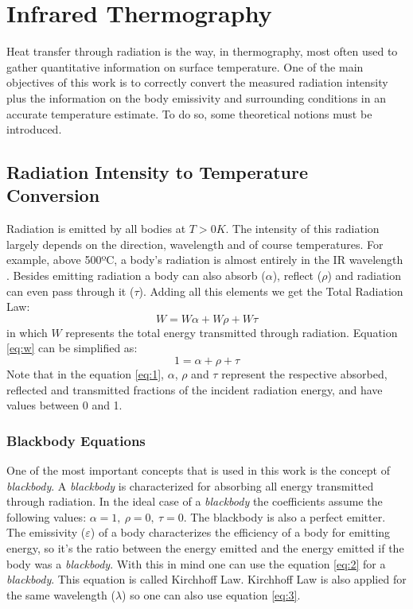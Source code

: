 \section{Infrared Thermography}
\label{sec:sectiona}

Heat transfer through radiation is the way, in thermography, most often used to gather quantitative information on surface temperature. One of the main objectives of this work is to correctly convert the measured radiation intensity plus the information on the body emissivity and surrounding conditions in an accurate temperature estimate. To do so, some theoretical notions must be introduced.

\subsection{Radiation Intensity to Temperature Conversion}
\label{subsec:rad2tem}

Radiation is emitted by all bodies at $T>0 K$. The intensity of this radiation largely depends on the direction, wavelength and of course temperatures. For example, above 500ºC, a body's radiation is almost entirely in the IR wavelength \cite{IRCAM}. Besides emitting radiation a body can also absorb ($\alpha$), reflect ($\rho$) and radiation can even pass through it ($\tau$). Adding all this elements we get the Total Radiation Law:
\begin{equation}\label{eq:w}
    W = W\alpha + W\rho + W\tau
\end{equation}
in which $W$ represents the total energy transmitted through radiation. Equation \ref{eq:w} can be simplified as:
\begin{equation}\label{eq:1}
	1 = \alpha + \rho + \tau
\end{equation}
Note that in the equation \ref{eq:1}, $\alpha$, $\rho$ and $\tau$ represent the respective absorbed, reflected and transmitted fractions of the incident radiation energy, and have values between 0 and 1.\\

\subsubsection{Blackbody Equations}

\par One of the most important concepts that is used in this work is the concept of \textit{blackbody}. A \textit{blackbody} is characterized for absorbing all energy transmitted through radiation. In the ideal case of a \textit{blackbody} the coefficients assume the following values: $\alpha=1, \ \rho=0, \ \tau=0$. The blackbody is also a perfect emitter. The emissivity ($\varepsilon$) of a body characterizes the efficiency of a body for emitting energy, so it's the ratio between the energy emitted and the energy emitted if the body was a \textit{blackbody}. With this in mind one can use the equation \ref{eq:2} for a \textit{blackbody}. This equation is called Kirchhoff Law. Kirchhoff Law is also applied for the same wavelength ($\lambda$) so one can also use equation \ref{eq:3}.

